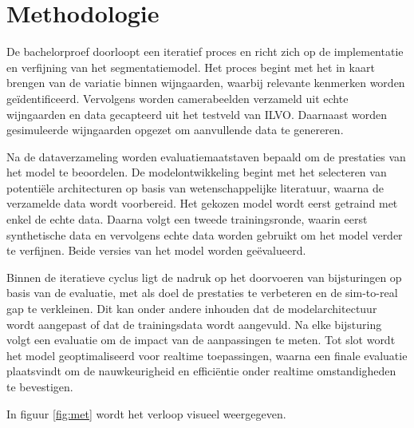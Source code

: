 \section{Methodologie}%
\label{sec:methodologie}

De bachelorproef doorloopt een iteratief proces en richt zich op de implementatie en verfijning van het segmentatiemodel. Het proces begint met het in kaart brengen van de variatie binnen wijngaarden, waarbij relevante kenmerken worden geïdentificeerd. Vervolgens worden camerabeelden verzameld uit echte wijngaarden en data gecapteerd uit het testveld van ILVO. Daarnaast worden gesimuleerde wijngaarden opgezet om aanvullende data te genereren.

Na de dataverzameling worden evaluatiemaatstaven bepaald om de prestaties van het model te beoordelen. De modelontwikkeling begint met het selecteren van potentiële architecturen op basis van wetenschappelijke literatuur, waarna de verzamelde data wordt voorbereid. Het gekozen model wordt eerst getraind met enkel de echte data. Daarna volgt een tweede trainingsronde, waarin eerst synthetische data en vervolgens echte data worden gebruikt om het model verder te verfijnen. Beide versies van het model worden geëvalueerd.

Binnen de iteratieve cyclus ligt de nadruk op het doorvoeren van bijsturingen op basis van de evaluatie, met als doel de prestaties te verbeteren en de sim-to-real gap te verkleinen. Dit kan onder andere inhouden dat de modelarchitectuur wordt aangepast of dat de trainingsdata wordt aangevuld. Na elke bijsturing volgt een evaluatie om de impact van de aanpassingen te meten. Tot slot wordt het model geoptimaliseerd voor realtime toepassingen, waarna een finale evaluatie plaatsvindt om de nauwkeurigheid en efficiëntie onder realtime omstandigheden te bevestigen.

In figuur \ref{fig:met} wordt het verloop visueel weergegeven.

